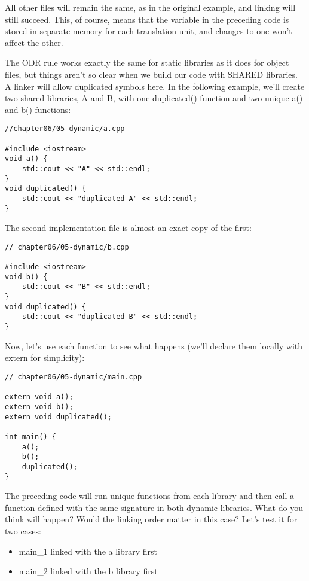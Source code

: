 All other files will remain the same, as in the original example, and linking will still succeed. This, of course, means that the variable in the preceding code is stored in separate memory for each translation unit, and changes to one won't affect the other.


The ODR rule works exactly the same for static libraries as it does for object files, but things aren't so clear when we build our code with SHARED libraries. A linker will allow duplicated symbols here. In the following example, we'll create two shared libraries, A and B, with one duplicated() function and two unique a() and b() functions:

\begin{lstlisting}[style=styleCXX]
//chapter06/05-dynamic/a.cpp

#include <iostream>
void a() {
	std::cout << "A" << std::endl;
}
void duplicated() {
	std::cout << "duplicated A" << std::endl;
}
\end{lstlisting}

The second implementation file is almost an exact copy of the first:

\begin{lstlisting}[style=styleCXX]
// chapter06/05-dynamic/b.cpp

#include <iostream>
void b() {
	std::cout << "B" << std::endl;
}
void duplicated() {
	std::cout << "duplicated B" << std::endl;
}
\end{lstlisting}

Now, let's use each function to see what happens (we'll declare them locally with extern for simplicity):

\begin{lstlisting}[style=styleCXX]
// chapter06/05-dynamic/main.cpp

extern void a();
extern void b();
extern void duplicated();

int main() {
	a();
	b();
	duplicated();
}
\end{lstlisting}

The preceding code will run unique functions from each library and then call a function defined with the same signature in both dynamic libraries. What do you think will happen? Would the linking order matter in this case? Let's test it for two cases:

\begin{itemize}
\item 
main\_1 linked with the a library first

\item 
main\_2 linked with the b library first
\end{itemize}

